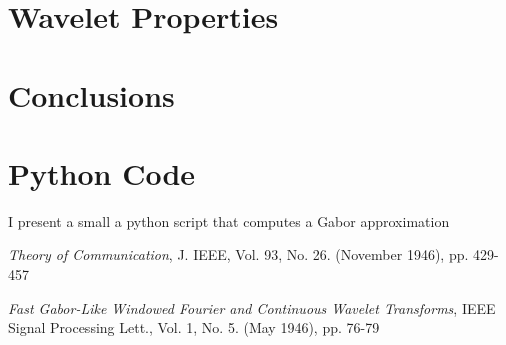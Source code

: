 \documentclass[journal]{IEEEtran}
\begin{document}
  \section{Wavelet Properties}
  \label{sec:properties}




\section{Conclusions}
\label{sec:conclusions}



\appendices
\section{Python Code}
I present a small a python script that computes a Gabor approximation



\begin{thebibliography}{99}

  \textit{Theory of Communication},
  J. IEEE, Vol. 93, No. 26. (November 1946), pp. 429-457

  \textit{Fast Gabor-Like Windowed Fourier and Continuous Wavelet Transforms},
  IEEE Signal Processing Lett., Vol. 1, No. 5. (May 1946), pp. 76-79

\end{thebibliography}





%
%
\end{document}
